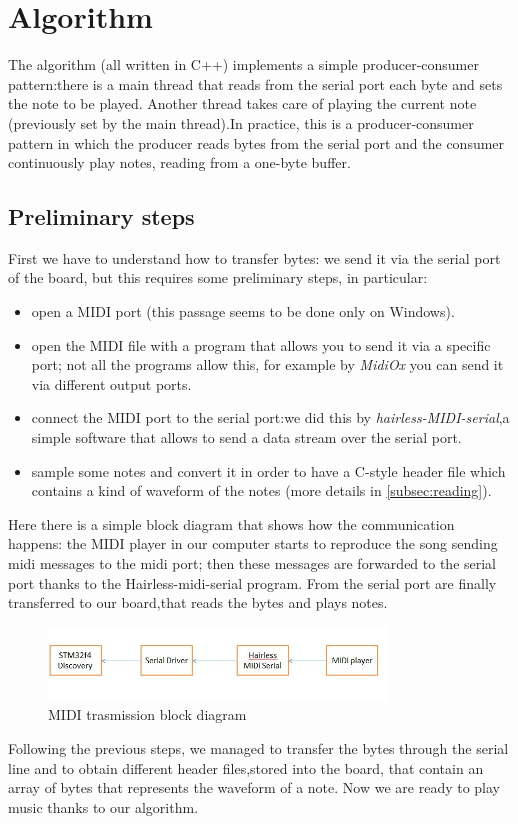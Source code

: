 \documentclass[12pt]{article}
\begin{document}
\section{Algorithm} \label{sec:algorithm}
The algorithm (all written in C++) implements a simple producer-consumer pattern:there is a main thread that reads from the serial port each byte and sets the note to be played. Another thread takes care of playing the current note (previously set by the main thread).In practice, this is a producer-consumer pattern in which the producer reads bytes from the serial port and the consumer continuously play notes, reading from a one-byte buffer.

\subsection{Preliminary steps}\label{subsec:pre_steps}
First we have to understand how to transfer bytes: we send it via the serial port of the board, but this requires some preliminary steps, in particular:
\begin{itemize}
	\item open a MIDI port (this passage seems to be done only on Windows).
	\item open the MIDI file with a program that allows you to send it via a specific port; not all the programs allow this, for example by \textit{MidiOx}  you can send it via different output ports.
	\item connect the MIDI port to the serial port:we did this by \textit{hairless-MIDI-serial},a simple software that allows to send a data stream over the serial port.
	\item sample some notes and convert it in order to have a C-style header file which contains a kind of waveform of the notes (more details in \ref{subsec:reading}).
\end{itemize}
Here there is a simple block diagram that shows how the communication happens: the MIDI player in our computer starts to reproduce the song sending midi messages to the midi port; then these messages are forwarded to the serial port thanks to the Hairless-midi-serial program. From the serial port are finally transferred to our board,that reads the bytes and plays notes.
 \begin{figure}[H]
 	\includegraphics[width=0.8\textwidth]{Schema.jpg}
 	\caption{MIDI trasmission block diagram}
 	\label{fig:block}
 \end{figure}
Following the previous steps, we managed to transfer the bytes through the serial line and to obtain different header files,stored into the board, that contain an array of bytes that represents the waveform of a note. Now we are ready to play music thanks to our algorithm.
\end{document}
